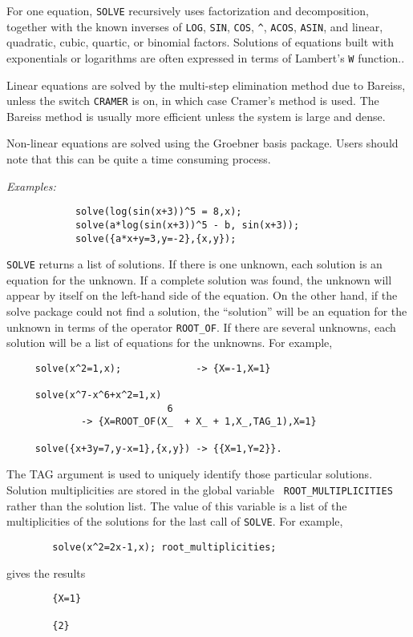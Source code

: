 For one equation, {\tt SOLVE} recursively uses
factorization and decomposition, together with the known inverses of
{\tt LOG}, {\tt SIN}, {\tt COS}, {\tt \verb|^|}, {\tt ACOS}, {\tt ASIN}, and
linear, quadratic, cubic, quartic, or binomial factors. Solutions
of equations built with exponentials or logarithms are often
expressed in terms of Lambert's {\tt W} function..

Linear equations are solved by the multi-step elimination method due to
Bareiss, unless the switch {\tt CRAMER} is on, in which
case Cramer's method is used.  The Bareiss method is usually more
efficient unless the system is large and dense.

Non-linear equations are solved using the Groebner basis package.
 Users should note that this can be quite a
time consuming process.

{\it Examples:}
\begin{verbatim}
            solve(log(sin(x+3))^5 = 8,x);
            solve(a*log(sin(x+3))^5 - b, sin(x+3));
            solve({a*x+y=3,y=-2},{x,y});
\end{verbatim}

{\tt SOLVE} returns a list of solutions.  If there is one unknown, each
solution is an equation for the unknown.  If a complete solution was
found, the unknown will appear by itself on the left-hand side of the
equation.  On the other hand, if the solve package could not find a
solution, the ``solution'' will be an equation for the unknown in terms
of the operator {\tt ROOT\_OF}. If there
are several unknowns, each solution will be a list of equations for the
unknowns.  For example,
\begin{verbatim}
     solve(x^2=1,x);             -> {X=-1,X=1}

     solve(x^7-x^6+x^2=1,x)
                            6
             -> {X=ROOT_OF(X_  + X_ + 1,X_,TAG_1),X=1}

     solve({x+3y=7,y-x=1},{x,y}) -> {{X=1,Y=2}}.
\end{verbatim}
The TAG argument is used to uniquely identify those particular solutions.
Solution multiplicities are stored in the global variable {\tt
ROOT\_MULTIPLICITIES} rather than the solution list.  The value of this
variable is a list of the multiplicities of the solutions for the last
call of {\tt SOLVE}.  For example,
\begin{verbatim}
        solve(x^2=2x-1,x); root_multiplicities;
\end{verbatim}
gives the results
\begin{verbatim}
        {X=1}

        {2}
\end{verbatim}

